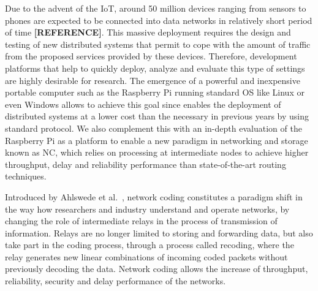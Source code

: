 %

Due to the advent of the \ac{IoT}, around 50 million devices
ranging from sensors to phones are expected to be connected into
data networks in relatively short period of time \textbf{[REFERENCE]}.
This massive deployment requires the design and testing of new
distributed systems that permit to cope with the amount of traffic
from the proposed services provided by these devices. Therefore,
development platforms that help to quickly deploy, analyze and
evaluate this type of settings are highly desirable for research.
The emergence of a powerful and inexpensive portable computer such
as the Raspberry Pi running standard \ac{OS} like Linux or even
Windows allows to achieve this goal since enables the deployment
of distributed systems at a lower cost than the necessary in
previous years by using standard protocol. We also complement this
with an in-depth evaluation of the Raspberry Pi as a platform to
enable a new paradigm in networking and storage known as \ac{NC},
which relies on processing at intermediate nodes to achieve
higher throughput, delay and reliability performance than
state-of-the-art routing techniques.

Introduced by Ahlswede et al.~\cite{ahlswede2000network}, network
coding constitutes a paradigm shift in the way how researchers and
industry understand and operate networks, by changing the role of
intermediate relays in the process of transmission of information.
Relays are no longer limited to storing and forwarding data, but also
take part in the coding process, through a process called recoding,
where the relay generates new linear combinations of incoming coded
packets without previously decoding the data. Network coding allows
the increase of throughput, reliability, security and delay
performance of the networks.

